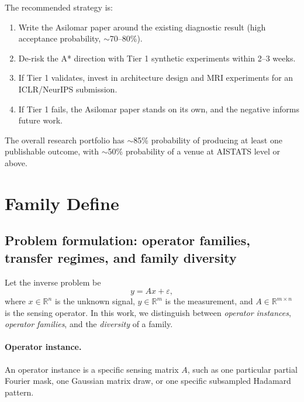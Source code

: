 \documentclass[11pt]{article}
\begin{document}
The recommended strategy is:
\begin{enumerate}[leftmargin=2em]
    \item Write the Asilomar paper around the existing diagnostic
    result (high acceptance probability, $\sim$70--80\%).
    \item De-risk the A* direction with Tier 1 synthetic
    experiments within 2--3 weeks.
    \item If Tier 1 validates, invest in architecture design and
    MRI experiments for an ICLR/NeurIPS submission.
    \item If Tier 1 fails, the Asilomar paper stands on its own,
    and the negative informs future work.
\end{enumerate}

The overall research portfolio has $\sim$85\% probability of
producing at least one publishable outcome, with $\sim$50\%
probability of a venue at AISTATS level or above.



\section{Family Define}
\subsection{Problem formulation: operator families, transfer regimes, and family diversity}

Let the inverse problem be
\begin{equation}
    y = A x + \varepsilon,
\end{equation}
where \(x \in \mathbb{R}^n\) is the unknown signal, \(y \in \mathbb{R}^m\) is the measurement, and \(A \in \mathbb{R}^{m \times n}\) is the sensing operator. In this work, we distinguish between \emph{operator instances}, \emph{operator families}, and the \emph{diversity} of a family.

\paragraph{Operator instance.}
An operator instance is a specific sensing matrix \(A\), such as one particular partial Fourier mask, one Gaussian matrix draw, or one specific subsampled Hadamard pattern.
\end{document}
